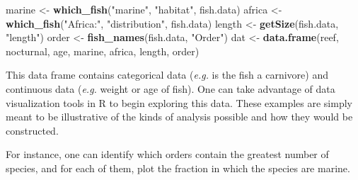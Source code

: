 \documentclass[author-year]{elsarticle} %
\newenvironment{Shaded}{}{}
\newcommand{\KeywordTok}[1]{\textcolor[rgb]{0.00,0.44,0.13}{\textbf{{#1}}}}
\newcommand{\StringTok}[1]{\textcolor[rgb]{0.25,0.44,0.63}{{#1}}}
\newcommand{\NormalTok}[1]{{#1}}
\begin{document}
\begin{Shaded}
\begin{Highlighting}[]
\NormalTok{marine <- }\KeywordTok{which_fish}\NormalTok{(}\StringTok{"marine"}\NormalTok{, }\StringTok{"habitat"}\NormalTok{, fish.data)}
\NormalTok{africa <- }\KeywordTok{which_fish}\NormalTok{(}\StringTok{"Africa:"}\NormalTok{, }\StringTok{"distribution"}\NormalTok{, fish.data)}
\NormalTok{length <- }\KeywordTok{getSize}\NormalTok{(fish.data, }\StringTok{"length"}\NormalTok{)}
\NormalTok{order <- }\KeywordTok{fish_names}\NormalTok{(fish.data, }\StringTok{"Order"}\NormalTok{)}
\NormalTok{dat <- }\KeywordTok{data.frame}\NormalTok{(reef, nocturnal,  age, marine, africa, length, order)}
\end{Highlighting}
\end{Shaded}
This data frame contains categorical data (\emph{e.g.} is the fish a
carnivore) and continuous data (\emph{e.g.} weight or age of fish). One
can take advantage of data visualization tools in R to begin exploring
this data. These examples are simply meant to be illustrative of the
kinds of analysis possible and how they would be constructed.

For instance, one can identify which orders contain the greatest number
of species, and for each of them, plot the fraction in which the species
are marine.
\end{document}
